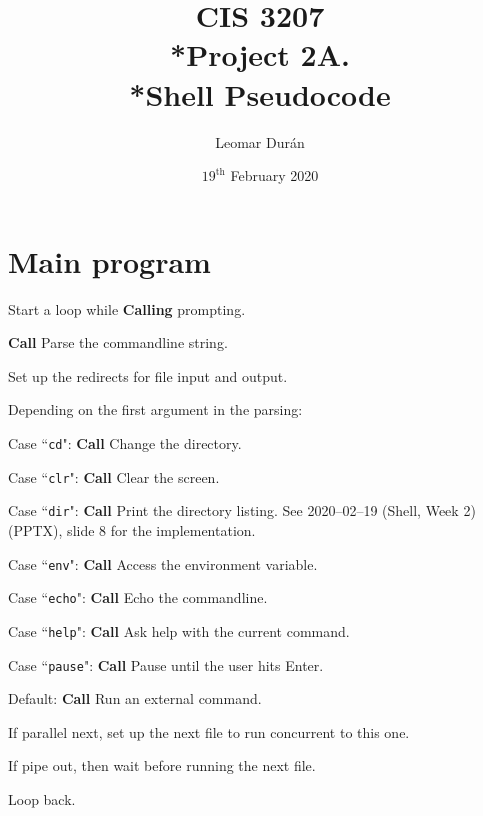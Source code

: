\documentclass{article}
\title{CIS 3207\\*Project 2A.\\*Shell Pseudocode}
\author{Leomar Dur\'an}
\date{\(19^{\text{th}}\) February 2020}
\begin{document}
\maketitle

\section{Main program}

\begin{deepenum}
    \item
        Start a loop while \textbf{Calling} prompting.
        \begin{deepenum}
            \item
                \textbf{Call} Parse the commandline string.
            \item
                Set up the redirects for file input and output.
            \item
                Depending on the first argument in the parsing:
                \begin{deepenum}
                    \item
                        Case ``\texttt{cd}": \textbf{Call} Change the directory.
                    \item
                        Case ``\texttt{clr}": \textbf{Call} Clear the screen.
                    \item
                        Case ``\texttt{dir}": \textbf{Call} Print the directory listing. See 2020--02--19 (Shell, Week 2) (PPTX), slide 8 for the implementation.
                    \item
                        Case ``\texttt{env}": \textbf{Call} Access the environment variable.
                    \item
                        Case ``\texttt{echo}": \textbf{Call} Echo the commandline.
                    \item
                        Case ``\texttt{help}": \textbf{Call} Ask help with the current command.
                    \item
                        Case ``\texttt{pause}": \textbf{Call} Pause until the user hits Enter.
                    \item
                        Default: \textbf{Call} Run an external command.
                \end{deepenum}
            \item
                If parallel next, set up the next file to run concurrent to this one.
            \item
                If pipe out, then wait before running the next file.
        \end{deepenum}
    \item
        Loop back.
\end{deepenum}
\end{document}
